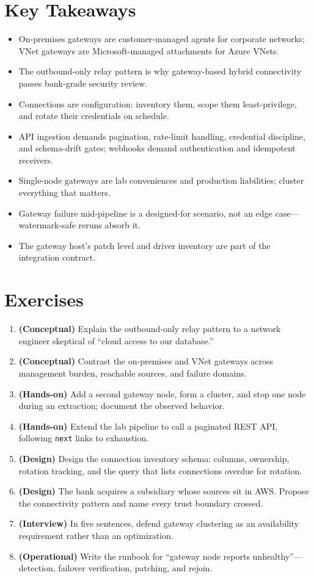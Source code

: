 \section*{Key Takeaways}
\begin{itemize}
    \item On-premises gateways are customer-managed agents for corporate networks; VNet gateways are Microsoft-managed attachments for Azure VNets.
    \item The outbound-only relay pattern is why gateway-based hybrid connectivity passes bank-grade security review.
    \item Connections are configuration: inventory them, scope them least-privilege, and rotate their credentials on schedule.
    \item API ingestion demands pagination, rate-limit handling, credential discipline, and schema-drift gates; webhooks demand authentication and idempotent receivers.
    \item Single-node gateways are lab conveniences and production liabilities; cluster everything that matters.
    \item Gateway failure mid-pipeline is a designed-for scenario, not an edge case---watermark-safe reruns absorb it.
    \item The gateway host's patch level and driver inventory are part of the integration contract.
\end{itemize}

\section{Exercises}
\begin{enumerate}
    \item \textbf{(Conceptual)} Explain the outbound-only relay pattern to a network engineer skeptical of ``cloud access to our database.''
    \item \textbf{(Conceptual)} Contrast the on-premises and VNet gateways across management burden, reachable sources, and failure domains.
    \item \textbf{(Hands-on)} Add a second gateway node, form a cluster, and stop one node during an extraction; document the observed behavior.
    \item \textbf{(Hands-on)} Extend the lab pipeline to call a paginated REST API, following \texttt{next} links to exhaustion.
    \item \textbf{(Design)} Design the connection inventory schema: columns, ownership, rotation tracking, and the query that lists connections overdue for rotation.
    \item \textbf{(Design)} The bank acquires a subsidiary whose sources sit in AWS. Propose the connectivity pattern and name every trust boundary crossed.
    \item \textbf{(Interview)} In five sentences, defend gateway clustering as an availability requirement rather than an optimization.
    \item \textbf{(Operational)} Write the runbook for ``gateway node reports unhealthy''---detection, failover verification, patching, and rejoin.
\end{enumerate}

